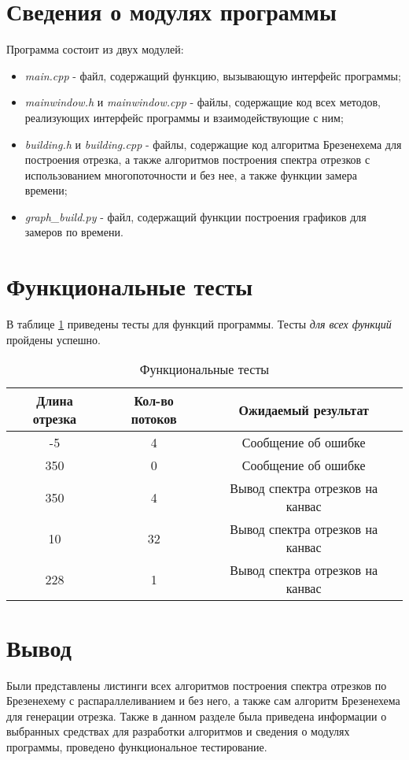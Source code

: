 \section{Сведения о модулях программы}
Программа состоит из двух модулей:
\begin{itemize}
	\item \textit{main.cpp} - файл, содержащий функцию, вызывающую интерфейс программы;
    \item \textit{mainwindow.h} и \textit{mainwindow.cpp} - файлы, содержащие код всех методов, реализующих интерфейс программы и взаимодействующие с ним;
	\item \textit{building.h} и \textit{building.cpp} - файлы, содержащие код алгоритма Брезенехема для построения отрезка, а также алгоритмов построения спектра отрезков с использованием многопоточности и без нее, а также функции замера времени;
	\item \textit{graph\_build.py} - файл, содержащий функции построения графиков для замеров по времени.
\end{itemize}


\section{Функциональные тесты}

В таблице \ref{tbl:functional_test} приведены тесты для функций программы. Тесты \textit{для всех функций} пройдены успешно.

\begin{table}[h]
	\begin{center}
        \begin{threeparttable}
        \captionsetup{justification=raggedright,singlelinecheck=off}
		\caption{\label{tbl:functional_test} Функциональные тесты}
		\begin{tabular}{|c|c|c|}
			\hline
			Длина отрезка & Кол-во потоков & Ожидаемый результат \\
			\hline
            -5 & 4 & Сообщение об ошибке \\
            \hline
            350 & 0 & Сообщение об ошибке \\
            \hline
            350 & 4 & Вывод спектра отрезков на канвас \\
            \hline
            10 & 32 & Вывод спектра отрезков на канвас \\
			\hline
			228 & 1 & Вывод спектра отрезков на канвас \\
			\hline
		\end{tabular}
        \end{threeparttable}
	\end{center}
\end{table}

\section{Вывод}

Были представлены листинги всех алгоритмов построения спектра отрезков по Брезенехему с распараллеливанием и без него, а также сам алгоритм Брезенехема для генерации отрезка. Также в данном разделе была приведена информации о выбранных средствах для разработки алгоритмов и сведения о модулях программы, проведено функциональное тестирование.
